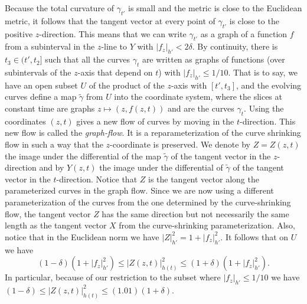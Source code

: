 Because the total curvature of $\gamma_{t'}$ is small and the metric
is close to the Euclidean metric, it follows that the tangent vector
at every point of $\gamma_{t'}$ is close to the positive
$z$-direction. This means that we can write $\gamma_{t'}$ as a graph
of a function $f$ from a subinterval in the $z$-line to $Y$ with
$|f_z|_{h'}<2\delta$. By continuity, there is $t_3\in (t',t_2]$ such
that all the curves $\gamma_{t}$ are written as graphs of functions
(over subintervals of the $z$-axis that depend on $t$) with
$|f_z|_{h'}\le 1/10$. That is to say, we have an open subset $U$ of
the product of the $z$-axis with $[t',t_3]$, and the evolving curves
define a map $\tilde\gamma$ from $U$ into the coordinate system,
where the slices at constant time are graphs $z\mapsto (z,f(z,t))$
and are the curves $\gamma_t$. Using the coordinates $(z,t)$ gives a
new flow of curves by moving in the $t$-direction. This new flow is
called the {\sl graph-flow}. It is
 a reparameterization of the curve shrinking flow in such a way that
the $z$-coordinate is preserved. We denote by $Z=Z(z,t)$ the image
under the differential of the map $\widetilde\gamma$ of the tangent
vector in the $z$-direction and by $Y(z,t)$ the image under the
differential of $\widetilde \gamma$ of the tangent vector in the
$t$-direction. Notice that $Z$ is the tangent vector along the
parameterized curves in the graph flow. Since we are now using a
different parameterization of the curves from the one determined by
the curve-shrinking flow, the tangent vector $Z$ has the same
direction but not necessarily the same length as the tangent vector
$X$ from the curve-shrinking parameterization. Also, notice that in
the Euclidean norm we have $|Z|_{h'}^2=1+|f_z|^2_{h'}$. It follows
that on $U$ we have
$$(1-\delta)(1+|f_z|_{h'}^2)\le |Z(z,t)|^2_{h(t)}\le (1+\delta)(1+|f_z|_{h'}^2).$$
In particular, because of our restriction to the subset where $|f_z|_{h'}\le
1/10$ we have  $(1-\delta)\le |Z(z,t)|^2_{h(t)}\le (1.01)(1+\delta)$.




